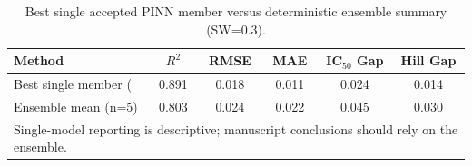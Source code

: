 \begin{table}[htbp]
\centering
\caption{Best single accepted PINN member versus deterministic ensemble summary (SW=0.3).}
\label{tab:single_vs_ensemble}
\begin{tabular}{lccccc}
\hline
\textbf{Method} & \textbf{$R^2$} & \textbf{RMSE} & \textbf{MAE} & \textbf{IC$_{50}$ Gap} & \textbf{Hill Gap} \\
\hline
Best single member (#9) & 0.891 & 0.018 & 0.011 & 0.024 & 0.014 \\
Ensemble mean (n=5) & 0.803 & 0.024 & 0.022 & 0.045 & 0.030 \\
\hline
\multicolumn{6}{l}{\small Single-model reporting is descriptive; manuscript conclusions should rely on the ensemble.} \\
\end{tabular}
\end{table}
